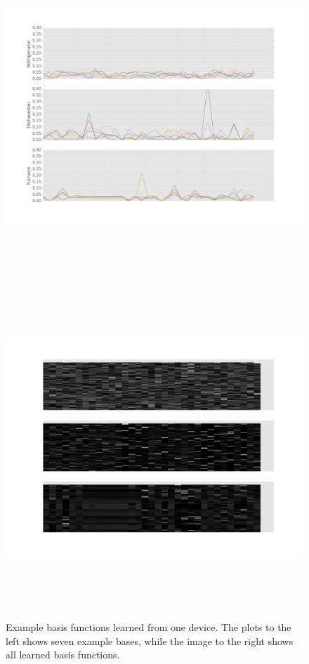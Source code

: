 \begin{figure}[H]
	\begin{center}

	\begin{minipage}{.5\textwidth}
		\centering
		\includegraphics[width=\textwidth,height=12cm]{./figures/app_basis}
		\label{fig:test1}
	\end{minipage}%
	\begin{minipage}{.5\textwidth}
		\centering
		\includegraphics[width=\textwidth,height=12cm]{./figures/basis}
		\label{fig:test2}
	\end{minipage}
	\caption{Example basis functions learned from one device. The plots to the left shows seven example bases, while the image to the right shows all learned basis functions.}
	\label{fig:basis_functions}
	\end{center}
\end{figure}

